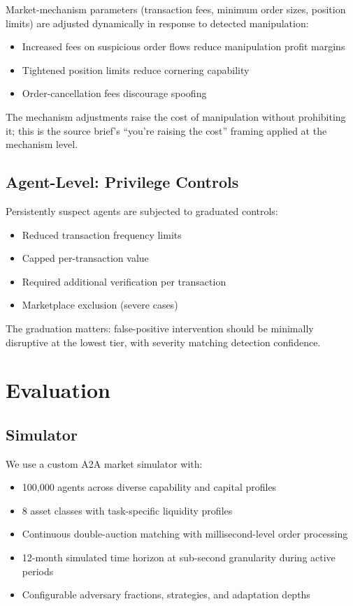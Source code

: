\documentclass[sigconf,nonacm]{acmart}
\begin{document}
Market-mechanism parameters (transaction fees, minimum order
sizes, position limits) are adjusted dynamically in response
to detected manipulation:

\begin{itemize}
  \item Increased fees on suspicious order flows reduce
        manipulation profit margins
  \item Tightened position limits reduce cornering capability
  \item Order-cancellation fees discourage spoofing
\end{itemize}

The mechanism adjustments raise the cost of manipulation without
prohibiting it; this is the source brief's ``you're raising the
cost'' framing applied at the mechanism level.

\subsection{Agent-Level: Privilege Controls}

Persistently suspect agents are subjected to graduated controls:

\begin{itemize}
  \item Reduced transaction frequency limits
  \item Capped per-transaction value
  \item Required additional verification per transaction
  \item Marketplace exclusion (severe cases)
\end{itemize}

The graduation matters: false-positive intervention should be
minimally disruptive at the lowest tier, with severity matching
detection confidence.

\section{Evaluation}

\subsection{Simulator}

We use a custom A2A market simulator with:

\begin{itemize}
  \item 100{,}000 agents across diverse capability and capital
        profiles
  \item 8 asset classes with task-specific liquidity profiles
  \item Continuous double-auction matching with millisecond-level
        order processing
  \item 12-month simulated time horizon at sub-second granularity
        during active periods
  \item Configurable adversary fractions, strategies, and
        adaptation depths
\end{itemize}
\end{document}
